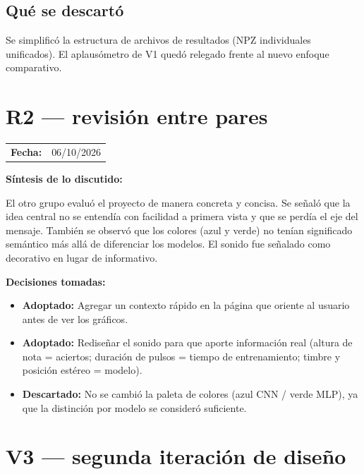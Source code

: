 \documentclass{article}
\begin{document}
\subsection{Qu\'{e} se descart\'{o}}

Se simplific\'{o} la estructura de archivos de resultados (NPZ individuales unificados).
El aplaus\'{o}metro de V1 qued\'{o} relegado frente al nuevo enfoque comparativo.

\section{R2 --- revisi\'{o}n entre pares}

\begin{tabular}{ll}
  \textbf{Fecha:} & {06/10/2026} \\
\end{tabular}

\medskip
\noindent\textbf{S\'{i}ntesis de lo discutido:}

El otro grupo evalu\'{o} el proyecto de manera concreta y concisa.
Se se\~{n}al\'{o} que la idea central no se entend\'{i}a con facilidad a primera vista y que
se perd\'{i}a el eje del mensaje.
Tambi\'{e}n se observ\'{o} que los colores (azul y verde) no ten\'{i}an significado
sem\'{a}ntico m\'{a}s all\'{a} de diferenciar los modelos.
El sonido fue se\~{n}alado como decorativo en lugar de informativo.

\medskip
\noindent\textbf{Decisiones tomadas:}

\begin{itemize}
  \item \textbf{Adoptado:} Agregar un contexto r\'{a}pido en la p\'{a}gina que oriente al
        usuario antes de ver los gr\'{a}ficos.
  \item \textbf{Adoptado:} Redise\~{n}ar el sonido para que aporte informaci\'{o}n real
        (altura de nota = aciertos; duraci\'{o}n de pulsos = tiempo de entrenamiento;
        timbre y posici\'{o}n est\'{e}reo = modelo).
  \item \textbf{Descartado:} No se cambi\'{o} la paleta de colores (azul CNN / verde MLP),
        ya que la distinci\'{o}n por modelo se consider\'{o} suficiente.
\end{itemize}

\section{V3 --- segunda iteraci\'{o}n de dise\~{n}o}
\end{document}
